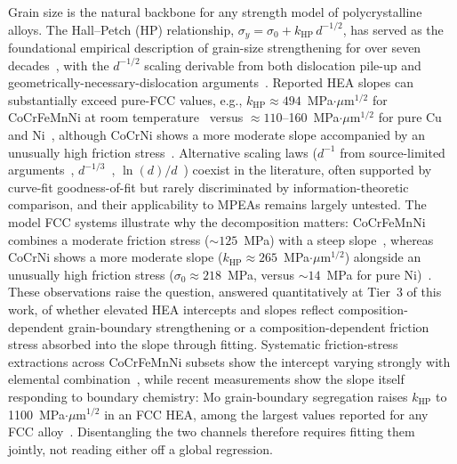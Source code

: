 \documentclass[5p,times,twocolumn]{elsarticle}
\begin{document}
Grain size is the natural backbone for any strength model of polycrystalline alloys. The Hall--Petch (HP) relationship, $\sigma_y = \sigma_0 + k_\text{HP}\,d^{-1/2}$, has served as the foundational empirical description of grain-size strengthening for over seven decades~\cite{Hall1951,Petch1953}, with the $d^{-1/2}$ scaling derivable from both dislocation pile-up and geometrically-necessary-dislocation arguments~\cite{Cordero2016}. Reported HEA slopes can substantially exceed pure-FCC values, e.g., $k_\text{HP} \approx 494$~MPa$\cdot\mu$m$^{1/2}$ for CoCrFeMnNi at room temperature~\cite{Otto2013} versus ${\approx}110$--160~MPa$\cdot\mu$m$^{1/2}$ for pure Cu and Ni~\cite{Cordero2016}, although CoCrNi shows a more moderate slope accompanied by an unusually high friction stress~\cite{Yoshida2017}. Alternative scaling laws ($d^{-1}$ from source-limited arguments~\cite{Dunstan2014}, $d^{-1/3}$~\cite{Baldwin1958}, $\ln(d)/d$~\cite{Li2016HP}) coexist in the literature, often supported by curve-fit goodness-of-fit but rarely discriminated by information-theoretic comparison, and their applicability to MPEAs remains largely untested. The model FCC systems illustrate why the decomposition matters: CoCrFeMnNi combines a moderate friction stress (${\sim}125$~\si{MPa}) with a steep slope~\cite{Otto2013}, whereas CoCrNi shows a more moderate slope ($k_\text{HP} \approx 265$~MPa$\cdot\mu$m$^{1/2}$) alongside an unusually high friction stress ($\sigma_0 \approx 218$~\si{MPa}, versus ${\sim}14$~\si{MPa} for pure Ni)~\cite{Yoshida2017}. These observations raise the question, answered quantitatively at Tier~3 of this work, of whether elevated HEA intercepts and slopes reflect composition-dependent grain-boundary strengthening or a composition-dependent friction stress absorbed into the slope through fitting. Systematic friction-stress extractions across CoCrFeMnNi subsets show the intercept varying strongly with elemental combination~\cite{Yoshida2019acta}, while recent measurements show the slope itself responding to boundary chemistry: Mo grain-boundary segregation raises $k_\text{HP}$ to 1100~MPa$\cdot\mu$m$^{1/2}$ in an FCC HEA, among the largest values reported for any FCC alloy~\cite{LiKHP2024}. Disentangling the two channels therefore requires fitting them jointly, not reading either off a global regression.
\end{document}
